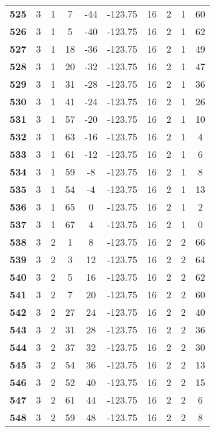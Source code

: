 \documentclass{article}%
\begin{document}
\begin{longtable}{cccccccccc}
        \textbf{525} & 3 & 1 & 7 & -44 & -123.75 & 16 & 2 & 1 & 60 \\ 
        \textbf{526} & 3 & 1 & 5 & -40 & -123.75 & 16 & 2 & 1 & 62 \\ 
        \textbf{527} & 3 & 1 & 18 & -36 & -123.75 & 16 & 2 & 1 & 49 \\ 
        \textbf{528} & 3 & 1 & 20 & -32 & -123.75 & 16 & 2 & 1 & 47 \\ 
        \textbf{529} & 3 & 1 & 31 & -28 & -123.75 & 16 & 2 & 1 & 36 \\ 
        \textbf{530} & 3 & 1 & 41 & -24 & -123.75 & 16 & 2 & 1 & 26 \\ 
        \textbf{531} & 3 & 1 & 57 & -20 & -123.75 & 16 & 2 & 1 & 10 \\ 
        \textbf{532} & 3 & 1 & 63 & -16 & -123.75 & 16 & 2 & 1 & 4 \\ 
        \textbf{533} & 3 & 1 & 61 & -12 & -123.75 & 16 & 2 & 1 & 6 \\ 
        \textbf{534} & 3 & 1 & 59 & -8 & -123.75 & 16 & 2 & 1 & 8 \\ 
        \textbf{535} & 3 & 1 & 54 & -4 & -123.75 & 16 & 2 & 1 & 13 \\ 
        \textbf{536} & 3 & 1 & 65 & 0 & -123.75 & 16 & 2 & 1 & 2 \\ 
        \textbf{537} & 3 & 1 & 67 & 4 & -123.75 & 16 & 2 & 1 & 0 \\ 
        \textbf{538} & 3 & 2 & 1 & 8 & -123.75 & 16 & 2 & 2 & 66 \\ 
        \textbf{539} & 3 & 2 & 3 & 12 & -123.75 & 16 & 2 & 2 & 64 \\ 
        \textbf{540} & 3 & 2 & 5 & 16 & -123.75 & 16 & 2 & 2 & 62 \\ 
        \textbf{541} & 3 & 2 & 7 & 20 & -123.75 & 16 & 2 & 2 & 60 \\ 
        \textbf{542} & 3 & 2 & 27 & 24 & -123.75 & 16 & 2 & 2 & 40 \\ 
        \textbf{543} & 3 & 2 & 31 & 28 & -123.75 & 16 & 2 & 2 & 36 \\ 
        \textbf{544} & 3 & 2 & 37 & 32 & -123.75 & 16 & 2 & 2 & 30 \\ 
        \textbf{545} & 3 & 2 & 54 & 36 & -123.75 & 16 & 2 & 2 & 13 \\ 
        \textbf{546} & 3 & 2 & 52 & 40 & -123.75 & 16 & 2 & 2 & 15 \\ 
        \textbf{547} & 3 & 2 & 61 & 44 & -123.75 & 16 & 2 & 2 & 6 \\ 
        \textbf{548} & 3 & 2 & 59 & 48 & -123.75 & 16 & 2 & 2 & 8 \\ 

\end{longtable}
\end{document}
